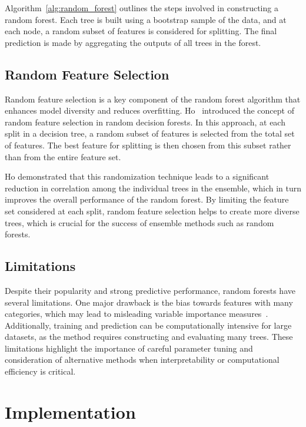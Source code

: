 \documentclass[conference]{IEEEtran}
\begin{document}
Algorithm~\ref{alg:random_forest} outlines the steps involved in constructing a random forest. Each tree is built using a bootstrap sample of the data, and at each node, a random subset of features is considered for splitting. The final prediction is made by aggregating the outputs of all trees in the forest.

\subsection{Random Feature Selection}

Random feature selection is a key component of the random forest algorithm that enhances model diversity and reduces overfitting. Ho~\cite{Ho1995} introduced the concept of random feature selection in random decision forests. In this approach, at each split in a decision tree, a random subset of features is selected from the total set of features. The best feature for splitting is then chosen from this subset rather than from the entire feature set.

Ho demonstrated that this randomization technique leads to a significant reduction in correlation among the individual trees in the ensemble, which in turn improves the overall performance of the random forest. By limiting the feature set considered at each split, random feature selection helps to create more diverse trees, which is crucial for the success of ensemble methods such as random forests.

\subsection{Limitations}

Despite their popularity and strong predictive performance, random forests have several limitations. One major drawback is the bias towards features with many categories, which may lead to misleading variable importance measures~\cite{Louppe2014}. Additionally, training and prediction can be computationally intensive for large datasets, as the method requires constructing and evaluating many trees. These limitations highlight the importance of careful parameter tuning and consideration of alternative methods when interpretability or computational efficiency is critical.

\section{Implementation}
\end{document}
